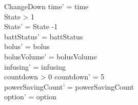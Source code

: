 \begin{schema}{ChangeDown}
	time' = time\\ 
	State > 1\\
	State' = State -1\\
	battStatus' = battStatus\\
	bolus' = bolus\\
	bolusVolume' = bolusVolume\\
	infusing' = infusing\\
	countdown > 0 \land countdown' = 5\\
	powerSavingCount' = powerSavingCount\\ option' = option\\
\end{schema}

